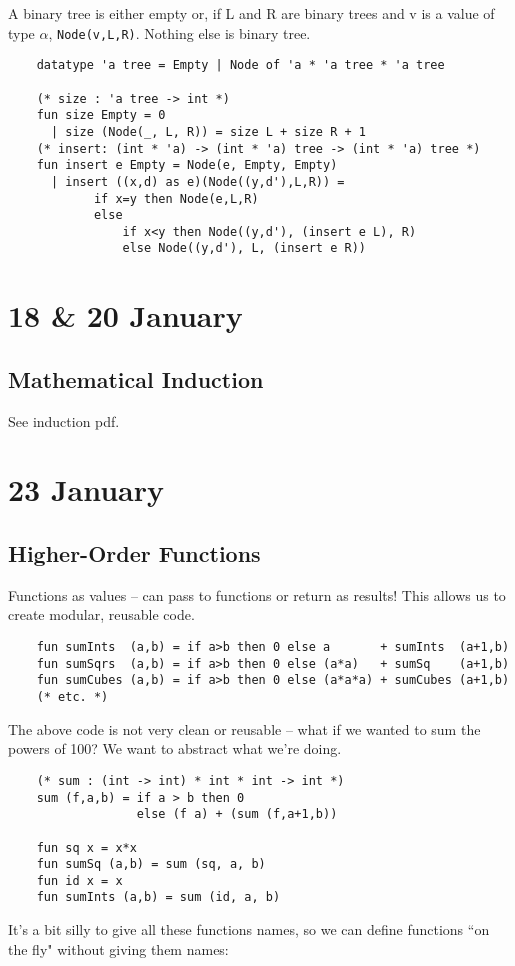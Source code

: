 \documentclass[11pt]{article}
\begin{document}
A binary tree is either empty or, if L and R are binary trees and v is a value of type $\alpha$, \verb!Node(v,L,R)!. Nothing else is binary tree.

\begin{verbatim}
    datatype 'a tree = Empty | Node of 'a * 'a tree * 'a tree
    
    (* size : 'a tree -> int *)
    fun size Empty = 0
      | size (Node(_, L, R)) = size L + size R + 1
    (* insert: (int * 'a) -> (int * 'a) tree -> (int * 'a) tree *)
    fun insert e Empty = Node(e, Empty, Empty)
      | insert ((x,d) as e)(Node((y,d'),L,R)) =
            if x=y then Node(e,L,R)
            else
                if x<y then Node((y,d'), (insert e L), R)
                else Node((y,d'), L, (insert e R))
\end{verbatim}

\section{18 \& 20 January} %
\subsection{Mathematical Induction}
See induction pdf.

\section{23 January} %
\subsection{Higher-Order Functions}
Functions as values -- can pass to functions or return as results! This allows us to create modular, reusable code.

\begin{verbatim}
    fun sumInts  (a,b) = if a>b then 0 else a       + sumInts  (a+1,b)
    fun sumSqrs  (a,b) = if a>b then 0 else (a*a)   + sumSq    (a+1,b)
    fun sumCubes (a,b) = if a>b then 0 else (a*a*a) + sumCubes (a+1,b)
    (* etc. *)
\end{verbatim}
The above code is not very clean or reusable -- what if we wanted to sum the powers of 100? We want to abstract what we're doing.

\begin{verbatim}
    (* sum : (int -> int) * int * int -> int *)
    sum (f,a,b) = if a > b then 0
                  else (f a) + (sum (f,a+1,b))
    
    fun sq x = x*x
    fun sumSq (a,b) = sum (sq, a, b)
    fun id x = x
    fun sumInts (a,b) = sum (id, a, b)
\end{verbatim}
It's a bit silly to give all these functions names, so we can define functions ``on the fly" without giving them names:
\end{document}

